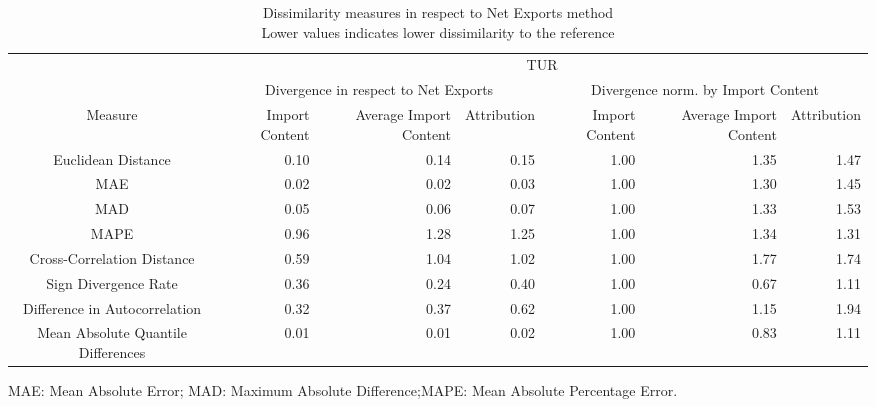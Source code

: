 \begin{table}[t]
\caption*{
{\large Dissimilarity measures in respect to Net Exports method} \\ 
{\small Lower values indicates lower dissimilarity to the reference}
} 
\fontsize{15.0pt}{18.0pt}\selectfont
\begin{tabular*}{\linewidth}{@{\extracolsep{\fill}}crrrrrr}
\toprule
 & \multicolumn{6}{c}{TUR} \\ 
\cmidrule(lr){2-7}
 & \multicolumn{3}{c}{Divergence in respect to Net Exports} & \multicolumn{3}{c}{Divergence norm. by Import Content} \\ 
\cmidrule(lr){2-4} \cmidrule(lr){5-7}
Measure & Import Content & Average Import Content & Attribution & Import Content & Average Import Content & Attribution \\ 
\midrule\addlinespace[2.5pt]
Euclidean Distance & 0.10 & 0.14 & 0.15 & 1.00 & 1.35 & 1.47 \\ 
MAE & 0.02 & 0.02 & 0.03 & 1.00 & 1.30 & 1.45 \\ 
MAD & 0.05 & 0.06 & 0.07 & 1.00 & 1.33 & 1.53 \\ 
MAPE & 0.96 & 1.28 & 1.25 & 1.00 & 1.34 & 1.31 \\ 
Cross-Correlation Distance & 0.59 & 1.04 & 1.02 & 1.00 & 1.77 & 1.74 \\ 
Sign Divergence Rate & 0.36 & 0.24 & 0.40 & 1.00 & 0.67 & 1.11 \\ 
Difference in Autocorrelation & 0.32 & 0.37 & 0.62 & 1.00 & 1.15 & 1.94 \\ 
Mean Absolute Quantile Differences & 0.01 & 0.01 & 0.02 & 1.00 & 0.83 & 1.11 \\ 
\bottomrule
\end{tabular*}
\begin{minipage}{\linewidth}
MAE: Mean Absolute Error; MAD: Maximum Absolute Difference;MAPE: Mean Absolute Percentage Error.\\
\end{minipage}
\end{table}

